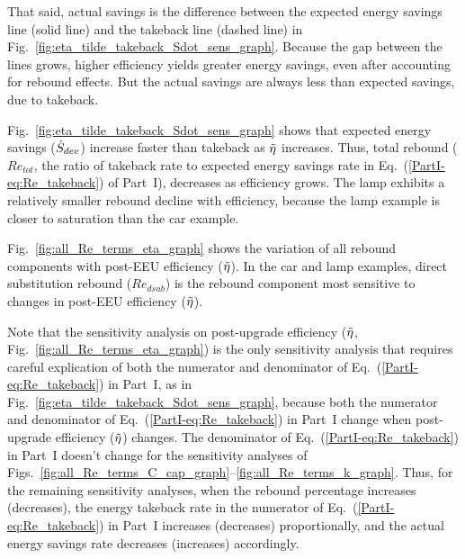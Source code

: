 \documentclass[12pt]{article}\usepackage[]{graphicx}\usepackage[]{xcolor}
\begin{document}
That said, actual savings is the difference between the expected energy savings line (solid line)
and the takeback line (dashed line) in Fig.~\ref{fig:eta_tilde_takeback_Sdot_sens_graph}.
Because the gap between the lines grows, 
higher efficiency yields greater energy savings,
even after accounting for rebound effects.
But the actual savings are always less than expected savings, due to takeback.

Fig.~\ref{fig:eta_tilde_takeback_Sdot_sens_graph} shows that
expected energy savings ($\dot{S}_{dev}$) increase faster than takeback 
as $\tilde{\eta}$ increases.
Thus, total rebound ($Re_{tot}$, the ratio of 
takeback rate to expected energy savings rate in Eq.~(\ref{PartI-eq:Re_takeback}) of Part~I),
decreases as efficiency grows.
The lamp exhibits a relatively smaller rebound decline with efficiency,
because the lamp example is closer to saturation than the car example.

Fig.~\ref{fig:all_Re_terms_eta_graph} shows the variation of all rebound components
with post-EEU efficiency ($\tilde{\eta}$).
In the car and lamp examples, 
direct substitution rebound ($Re_{dsub}$) is the 
rebound component 
most sensitive to changes in post-EEU efficiency ($\tilde{\eta}$).


Note that the sensitivity analysis on post-upgrade efficiency 
($\tilde{\eta}$, Fig.~\ref{fig:all_Re_terms_eta_graph})
is the only sensitivity analysis that requires careful explication
of both the numerator and denominator of Eq.~(\ref{PartI-eq:Re_takeback}) in Part~I,
as in Fig.~\ref{fig:eta_tilde_takeback_Sdot_sens_graph}, 
because both the numerator and denominator of Eq.~(\ref{PartI-eq:Re_takeback}) in Part~I
change when post-upgrade efficiency ($\tilde{\eta}$) changes.
The denominator of Eq.~(\ref{PartI-eq:Re_takeback}) in Part~I doesn't change for
the sensitivity analyses of Figs.~\ref{fig:all_Re_terms_C_cap_graph}--\ref{fig:all_Re_terms_k_graph}.
Thus, for the remaining sensitivity analyses, 
when the rebound percentage increases (decreases), 
the energy takeback rate in the numerator of Eq.~(\ref{PartI-eq:Re_takeback}) in Part~I
increases (decreases) proportionally,
and the actual energy savings rate decreases (increases) accordingly.
\end{document}
